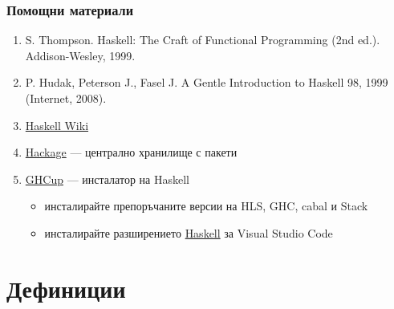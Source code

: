 \documentclass[alsotrans,beameroptions={aspectratio=169}]{beamerswitch}
\begin{document}
\begin{frame}
  \frametitle{Помощни материали}

  \begin{enumerate}
  \item S. Thompson. Haskell: The Craft of Functional Programming (2nd ed.). Addison-Wesley, 1999.
  \item P. Hudak, Peterson J., Fasel J. A Gentle Introduction to Haskell 98, 1999 (Internet, 2008).
  \item \href{https://wiki.haskell.org/Haskell}{Haskell Wiki}
  \item \href{https://hackage.haskell.org/}{Hackage} --- централно хранилище с пакети
  \item \href{https://www.haskell.org/ghcup/}{GHCup} --- инсталатор на Haskell
    \begin{itemize}
    \item инсталирайте препоръчаните версии на HLS, GHC, cabal и Stack
    \item инсталирайте разширението \href{https://marketplace.visualstudio.com/items?itemName=haskell.haskell}{Haskell} за Visual Studio Code
    \end{itemize}
  \end{enumerate}
\end{frame}

\section{Дефиниции}
\end{document}
